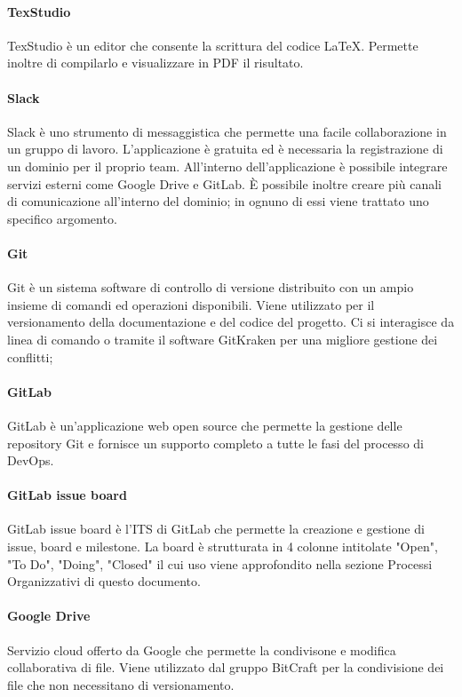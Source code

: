 \paragraph{TexStudio}
TexStudio è un editor che consente la scrittura del codice \LaTeX. Permette inoltre di compilarlo e visualizzare in PDF il risultato.

\paragraph{Slack}
Slack è uno strumento di messaggistica che permette una facile collaborazione in un gruppo di lavoro. L’applicazione è gratuita ed è necessaria la registrazione di un dominio per il proprio team. All'interno dell'applicazione è possibile integrare servizi esterni come Google Drive e GitLab. È possibile inoltre creare più canali di comunicazione all'interno del dominio;  in ognuno di essi viene trattato uno specifico argomento. 

\paragraph{Git} 
Git è un sistema software di controllo di versione distribuito con un ampio insieme di comandi ed operazioni disponibili. Viene utilizzato per il versionamento della documentazione e del codice del progetto. Ci si interagisce da linea di comando o tramite il software GitKraken per una migliore gestione dei conflitti;

\paragraph{GitLab}
GitLab è un'applicazione web open source che permette la gestione delle repository Git e fornisce un supporto completo a tutte le fasi del processo di DevOps.   

\paragraph{GitLab issue board}
GitLab issue board è l'ITS di GitLab che permette la creazione e gestione di issue, board e milestone. La board è strutturata in 4 colonne intitolate "Open", "To Do", "Doing", "Closed" il cui uso viene approfondito nella sezione Processi Organizzativi di questo documento.

\paragraph{Google Drive}
Servizio cloud offerto da Google che permette la condivisone e modifica collaborativa di file. Viene utilizzato dal gruppo BitCraft per la condivisione dei file che non necessitano di versionamento.

